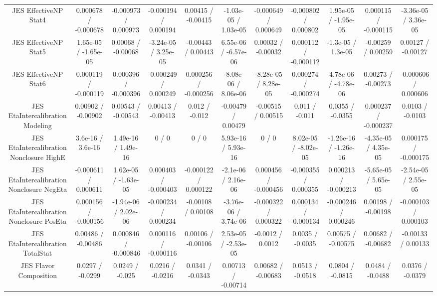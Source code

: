 \begin{table}[htbp]
\begin{center}
\begin{tabular}{|c|c|c|c|c|c|c|c|c|c|c|}
  JES EffectiveNP Stat4 & 0.000678 / -0.000678 & -0.000973 / 0.000973 & -0.000194 / 0.000194 & 0.00415 / -0.00415 & -1.03e-05 / 1.03e-05 & -0.000649 / 0.000649 & -0.000802 / 0.000802 & 1.95e-05 / -1.95e-05 & 0.000115 / -0.000115 & -3.36e-05 / 3.36e-05 \\ 
  JES EffectiveNP Stat5 & 1.65e-05 / -1.65e-05 & 0.00068 / -0.00068 & -3.24e-05 / 3.25e-05 & -0.00443 / 0.00443 & 6.55e-06 / -6.57e-06 & 0.00032 / -0.00032 & 0.000112 / -0.000112 & -1.3e-05 / 1.3e-05 & -0.00259 / 0.00259 & 0.00127 / -0.00127 \\ 
  JES EffectiveNP Stat6 & 0.000119 / -0.000119 & 0.000396 / -0.000396 & -0.000249 / 0.000249 & 0.000256 / -0.000256 & -8.08e-06 / 8.06e-06 & -8.28e-05 / 8.28e-05 & 0.000274 / -0.000274 & 4.78e-06 / -4.78e-06 & 0.00273 / -0.00273 & -0.000606 / 0.000606 \\ 
  JES EtaIntercalibration Modeling & 0.00902 / -0.00902 & 0.00543 / -0.00543 & 0.00413 / -0.00413 & 0.012 / -0.012 & -0.00479 / 0.00479 & -0.00515 / 0.00515 & 0.011 / -0.011 & 0.0355 / -0.0355 & 0.000237 / -0.000237 & 0.0103 / -0.0103 \\ 
  JES EtaIntercalibration Nonclosure HighE & 3.6e-16 / 3.6e-16 & 1.49e-16 / 1.49e-16 & 0 / 0 & 0 / 0 & 5.93e-16 / 5.93e-16 & 0 / 0 & 8.02e-05 / -8.02e-05 & -1.26e-16 / -1.26e-16 & -4.35e-05 / 4.35e-05 & 0.000175 / -0.000175 \\ 
  JES EtaIntercalibration Nonclosure NegEta & -0.000611 / 0.000611 & 1.62e-05 / -1.63e-05 & 0.000403 / -0.000403 & -0.000122 / 0.000122 & -2.1e-06 / 2.16e-06 & 0.000456 / -0.000456 & -0.000355 / 0.000355 & 0.000213 / -0.000213 & -5.65e-05 / 5.65e-05 & -2.54e-05 / 2.55e-05 \\ 
  JES EtaIntercalibration Nonclosure PosEta & 0.000156 / -0.000156 & -1.94e-06 / 2.02e-06 & -0.000234 / 0.000234 & -0.00108 / 0.00108 & -3.76e-06 / 3.74e-06 & -0.000322 / 0.000322 & 0.000134 / -0.000134 & -0.000246 / 0.000246 & 0.00198 / -0.00198 & -0.000103 / 0.000103 \\ 
  JES EtaIntercalibration TotalStat & 0.00486 / -0.00486 & 0.000846 / -0.000846 & 0.000116 / -0.000116 & 0.00106 / -0.00106 & 2.53e-05 / -2.53e-05 & -0.0012 / 0.0012 & 0.0035 / -0.0035 & 0.00575 / -0.00575 & 0.00682 / -0.00682 & -0.00133 / 0.00133 \\ 
  JES Flavor Composition & 0.0297 / -0.0299 & 0.0249 / -0.025 & 0.0216 / -0.0216 & 0.0341 / -0.0343 & 0.00713 / -0.00714 & 0.00682 / -0.00683 & 0.0513 / -0.0518 & 0.0804 / -0.0815 & 0.0484 / -0.0488 & 0.0376 / -0.0379 \\ 

\end{tabular}
\end{center}
\end{table}
